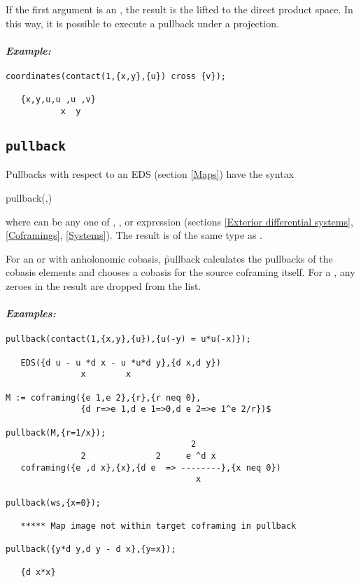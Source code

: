 If the first argument is an , the result is the 
lifted to the direct product space. In this way, it is possible to
execute a pullback under a projection. 

\paragraph{\it Example:}
\begin{verbatim}
coordinates(contact(1,{x,y},{u}) cross {v});

   {x,y,u,u ,u ,v}
           x  y 
\end{verbatim}

\subsection{\tt pullback}
\label{pullback}

Pullbacks with respect to an EDS  (section \ref{Maps}) have the
syntax
\begin{syntax}
	pullback(,)
\end{syntax}
where  can be any one of , ,
 or  expression (sections \ref{Exterior
differential systems}, \ref{Coframings}, \ref{Systems}). The result is of
the same type as .

For an  or  with anholonomic cobasis, \f{pullback}
calculates the pullbacks of the cobasis elements and chooses a cobasis for
the source coframing itself. For a , any zeroes in the result
are dropped from the list.

\paragraph{\it Examples:}
\begin{verbatim}
pullback(contact(1,{x,y},{u}),{u(-y) = u*u(-x)});

   EDS({d u - u *d x - u *u*d y},{d x,d y})
               x        x 

M := coframing({e 1,e 2},{r},{r neq 0},
               {d r=>e 1,d e 1=>0,d e 2=>e 1^e 2/r})$

pullback(M,{r=1/x});
                                     2
               2              2     e ^d x
   coframing({e ,d x},{x},{d e  => --------},{x neq 0})
                                      x 

pullback(ws,{x=0});

   ***** Map image not within target coframing in pullback  

pullback({y*d y,d y - d x},{y=x});

   {d x*x}
\end{verbatim}

